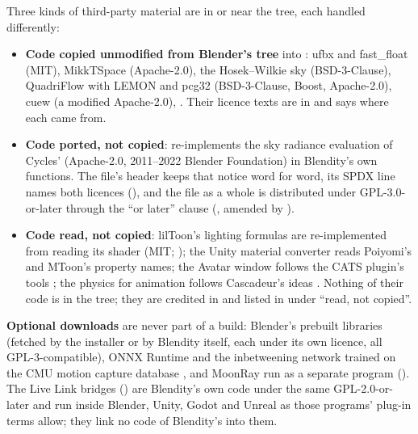 Three kinds of third-party material are in or near the tree, each handled differently:
\begin{itemize}
  \item \textbf{Code copied unmodified from Blender's tree} into : ufbx and fast\_float (MIT), MikkTSpace
    (Apache-2.0), the Hosek--Wilkie sky (BSD-3-Clause), QuadriFlow with LEMON and pcg32 (BSD-3-Clause, Boost, Apache-2.0),
    cuew (a modified Apache-2.0), . Their licence texts are in  and
     says where each came from.
  \item \textbf{Code ported, not copied}:  re-implements the sky radiance evaluation of Cycles'
     (Apache-2.0, 2011--2022 Blender Foundation) in Blendity's own functions. The
    file's header keeps that notice word for word, its SPDX line names both licences (), and the file as a whole is distributed under GPL-3.0-or-later through the ``or later'' clause
    (, amended by ).
  \item \textbf{Code read, not copied}: lilToon's lighting formulas \cite{lilToon2026} are re-implemented from reading
    its shader (MIT; ); the Unity material converter reads Poiyomi's \cite{Poiyomi2026} and MToon's
    \cite{MToon2026} property names; the Avatar window follows the CATS plugin's tools \cite{CATS2026}; the physics for
    animation follows Cascadeur's ideas \cite{Cascadeur2026}. Nothing of their code is in the tree; they are credited
    in  and listed in  under ``read, not copied''.
\end{itemize}

\textbf{Optional downloads} are never part of a build: Blender's prebuilt libraries (fetched by the installer or by
Blendity itself, each under its own licence, all GPL-3-compatible), ONNX Runtime \cite{ONNXRuntime2026} and the
inbetweening network trained on the CMU motion capture database \cite{CMUmocap2026}, and MoonRay \cite{MoonRay2026}
run as a separate program (). The Live Link bridges () are Blendity's own code under the same
GPL-2.0-or-later and run inside Blender, Unity, Godot and Unreal as those programs' plug-in terms allow; they link no
code of Blendity's into them.

